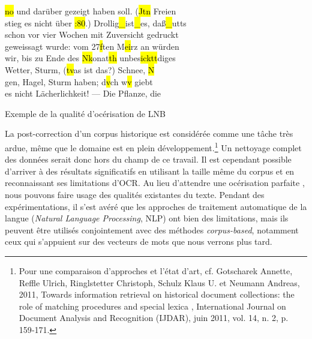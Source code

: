 \documentclass[a4paper,twoside,12pt]{article}
\begin{document}
\begin{table}[h]
\begin{varwidth}[b]{0.5\textwidth}
{{\hl{no\fg{}} und darüber gezeigt haben soll. (\hl{Jtn} Freien\\
stieg es nicht über \hl{:80}.) Drollig\hl{\_}ist\hl{\_}es, daß\hl{\_}utts\\
schon vor vier Wochen mit Zuversicht gedruckt\\
geweissagt wurde: vom 27\hl{f}ten M\hl{ei}rz an würden\\
wir, bis zu Ende des \hl{Nk}onat\hl{th} unbes\hl{icktt}diges\\
Wetter, Sturm, (\hl{tv}as ist das?) Schnee, \hl{N\fg{}}\\
gen, Hagel, Sturm haben; d\hl{v}ch w\hl{v} giebt\\
es nicht \hl{\fg{}}Lächerlichkeit! —\hl{\fg{}} Die Pflanze, die}}
  \end{varwidth}%
  \caption{Exemple de la qualité d'océrisation de LNB}
  \label{table:ocr}
\end{table}

La post-correction d'un corpus historique est considérée comme une tâche très ardue, même que le domaine est en plein développement.\footnote{Pour une comparaison d'approches et l'état d'art, cf. Gotscharek Annette, Reffle Ulrich, Ringlstetter Christoph, Schulz Klaus U. et Neumann Andreas, 2011, \og Towards information retrieval on historical document collections: the role of matching procedures and special lexica \fg{}, International Journal on Document Analysis and Recognition (IJDAR), juin 2011, vol. 14, n. 2, p. 159‑171.} Un nettoyage complet des données serait donc hors du champ de ce travail. Il est cependant possible d'arriver à des résultats significatifs en utilisant la taille même du corpus et en reconnaissant ses limitations d'OCR. Au lieu d'attendre une océrisation \og parfaite \fg{}, nous pouvons faire usage des qualités existantes du texte. Pendant des expérimentations, il s'est avéré que les approches de traitement automatique de la langue (\textit{Natural Language Processing}, NLP) ont bien des limitations, mais ils peuvent être utilisés conjointement avec des méthodes \textit{corpus-based}, notamment ceux qui s'appuient sur des vecteurs de mots que nous verrons plus tard.
\end{document}
